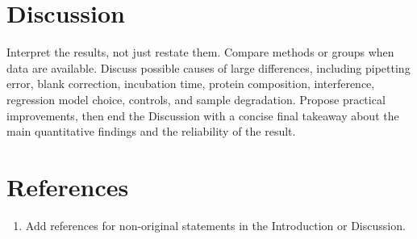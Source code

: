 \documentclass[lang={{LANG}},a4paper,11pt]{elegantpaper}
\begin{document}
\section{Discussion}

Interpret the results, not just restate them. Compare methods or groups when data are available. Discuss possible causes of large differences, including pipetting error, blank correction, incubation time, protein composition, interference, regression model choice, controls, and sample degradation. Propose practical improvements, then end the Discussion with a concise final takeaway about the main quantitative findings and the reliability of the result.

\section{References}

\begin{enumerate}
  \item Add references for non-original statements in the Introduction or Discussion.
\end{enumerate}
\end{document}
